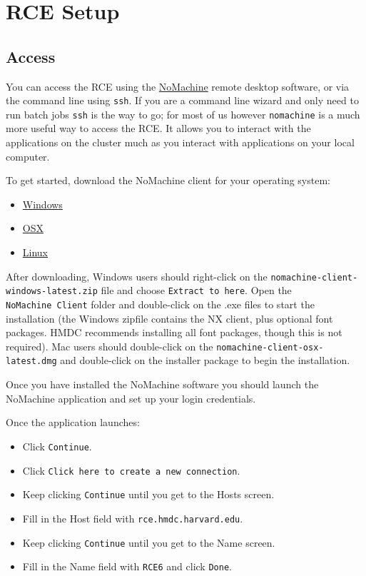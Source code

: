 \documentclass[
]{book}
\providecommand{\tightlist}{%
  \setlength{\itemsep}{0pt}\setlength{\parskip}{0pt}}
\begin{document}
\hypertarget{rce-setup}{%
\chapter{RCE Setup}\label{rce-setup}}

\hypertarget{access}{%
\section{Access}\label{access}}

You can access the RCE using the
\href{http://projects.iq.harvard.edu/rce/nx4_installation}{NoMachine} remote
desktop software, or via the command line using \texttt{ssh}. If you are a
command line wizard and only need to run batch jobs \texttt{ssh} is the way to
go; for most of us however \texttt{nomachine} is a much more useful way to
access the RCE. It allows you to interact with the applications on the
cluster much as you interact with applications on your local computer.

To get started, download the NoMachine client for your operating system:

\begin{itemize}
\tightlist
\item
  \href{http://downloads.hmdc.harvard.edu/nx/4/nomachine-client-windows-latest.zip}{Windows}
\item
  \href{http://downloads.hmdc.harvard.edu/nx/4/nomachine-client-osx-latest.dmg}{OSX}
\item
  \href{http://downloads.hmdc.harvard.edu/nx/4/nomachine-client-linux-latest.zip}{Linux}
\end{itemize}

After downloading, Windows users should right-click on the
\texttt{nomachine-client-windows-latest.zip} file and choose \texttt{Extract\ to\ here}.
Open the \texttt{NoMachine\ Client} folder and double-click on the .exe files to
start the installation (the Windows zipfile contains the NX client, plus optional
font packages. HMDC recommends installing all font packages, though
this is not required). Mac users should double-click on the
\texttt{nomachine-client-osx-latest.dmg} and double-click on the installer
package to begin the installation.

Once you have installed the NoMachine software you should launch the
NoMachine application and set up your login credentials.

Once the application launches:

\begin{itemize}
\tightlist
\item
  Click \texttt{Continue}.
\item
  Click \texttt{Click\ here\ to\ create\ a\ new\ connection}.
\item
  Keep clicking \texttt{Continue} until you get to the Hosts screen.
\item
  Fill in the Host field with \texttt{rce.hmdc.harvard.edu}.
\item
  Keep clicking \texttt{Continue} until you get to the Name screen.
\item
  Fill in the Name field with \texttt{RCE6} and click \texttt{Done}.
\end{itemize}
\end{document}
